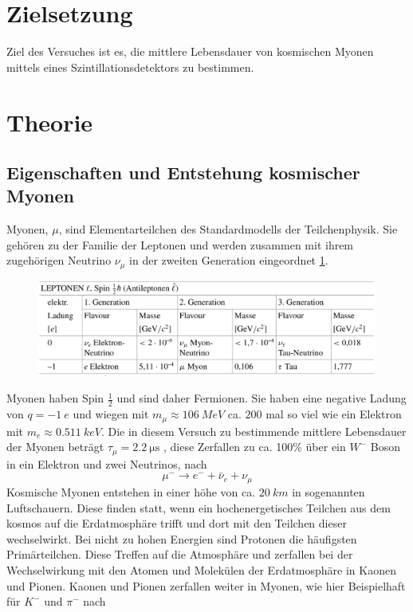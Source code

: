 \section{Zielsetzung}
\label{sec:Zielsetzung}
Ziel des Versuches ist es, die mittlere Lebensdauer von kosmischen Myonen mittels eines Szintillationsdetektors zu bestimmen. 

\section{Theorie}
\label{sec:Theorie}
\subsection{Eigenschaften und Entstehung kosmischer Myonen}
Myonen, $\mu$, sind Elementarteilchen des Standardmodells der Teilchenphysik. Sie gehören zu der Familie der Leptonen und werden zusammen mit ihrem zugehörigen Neutrino $\nu_\mu$ in der zweiten Generation eingeordnet \ref{fig:std}.
\begin{figure}[H]
    \centering
    \includegraphics[width=\linewidth]{data/leptonen_std.png}
    \label{fig:std}
\end{figure}
\noindent
Myonen haben Spin $\frac{1}{2}$ und sind daher Fermionen. Sie haben eine negative Ladung von $q = \SI{-1}{e}$ und wiegen mit $m_\mu \approx \SI{106}{MeV}$ ca. $200$ mal so viel wie ein Elektron mit $m_e \approx \SI{0.511}{keV}$. Die in diesem Versuch zu bestimmende mittlere Lebensdauer der Myonen beträgt $\tau_{\mu} = \SI{2.2}{\micro\second}$ \cite{pdg}, diese Zerfallen zu ca. 100\% \cite{pdg} über ein $W^{-}$ Boson in ein Elektron und zwei Neutrinos, nach 
\begin{equation}
    \mu^- \rightarrow e^- + \bar{\nu}_e + \nu_\mu
\end{equation}
Kosmische Myonen entstehen in einer höhe von ca. $\SI{20}{km}$ in sogenannten Luftschauern. Diese finden statt, wenn ein hochenergetisches Teilchen aus dem kosmos auf die Erdatmosphäre trifft und dort mit den Teilchen dieser wechselwirkt.
Bei nicht zu hohen Energien sind Protonen die häufigsten Primärteilchen. Diese Treffen auf die Atmosphäre und zerfallen bei der Wechselwirkung mit den Atomen und Molekülen der Erdatmosphäre in Kaonen und Pionen. Kaonen und Pionen zerfallen weiter in Myonen, wie hier Beispielhaft für $K^-$ und $\pi^-$ nach
